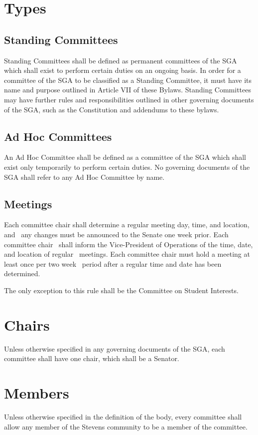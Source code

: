 \documentclass[12pt]{scrreprt}
\begin{document}
\section{Types}

\subsection{Standing Committees}
Standing Committees shall be defined as permanent committees of the SGA which shall exist to perform certain duties on an ongoing basis. In order for a committee of the SGA to be classified as a Standing Committee, it must have its name and purpose outlined in Article VII of these Bylaws. Standing Committees may have further rules and responsibilities outlined in other governing documents of the SGA, such as the Constitution and addendums to these bylaws.

\subsection{Ad Hoc Committees}
An Ad Hoc Committee shall be defined as a committee of the SGA which shall exist only temporarily to perform certain duties. No governing documents of the SGA shall refer to any Ad Hoc Committee by name.

\subsection{Meetings}
Each committee chair shall determine a regular meeting day, time, and location, and  any changes must be announced to the Senate one week prior. Each committee chair  shall inform the Vice-President of Operations of the time, date, and location of regular  meetings. Each committee chair must hold a meeting at least once per two week  period after a regular time and date has been determined. 

The only exception to this rule shall be the Committee on Student Interests.

\section{Chairs}
Unless otherwise specified in any governing documents of the SGA, each committee shall have one chair, which shall be a Senator.

\section{Members}
Unless otherwise specified in the definition of the body, every committee 
shall allow any member of the Stevens community to be a member of the 
committee.
\end{document}
